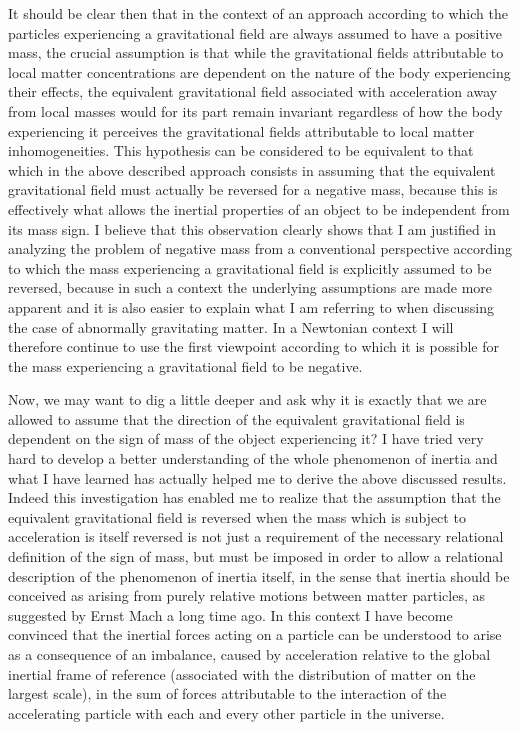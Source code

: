 \documentclass[notitlepage,12pt]{report}
\begin{document}
It should be clear then that in the context of an approach according to which the particles experiencing a gravitational field are always assumed to have a positive mass, the crucial assumption is that while the gravitational fields attributable to local matter concentrations are dependent on the nature of the body experiencing their effects, the equivalent gravitational field associated with acceleration away from local masses would for its part remain invariant regardless of how the body experiencing it perceives the gravitational fields attributable to local matter inhomogeneities. This hypothesis can be considered to be equivalent to that which in the above described approach consists in assuming that the equivalent gravitational field must actually be reversed for a negative mass, because this is effectively what allows the inertial properties of an object to be independent from its mass sign. I believe that this observation clearly shows that I am justified in analyzing the problem of negative mass from a conventional perspective according to which the mass experiencing a gravitational field is explicitly assumed to be reversed, because in such a context the underlying assumptions are made more apparent and it is also easier to explain what I am referring to when discussing the case of abnormally gravitating matter. In a Newtonian context I will therefore continue to use the first viewpoint according to which it is possible for the mass experiencing a gravitational field to be negative.

Now, we may want to dig a little deeper and ask why it is exactly that we are allowed to assume that the direction of the equivalent gravitational field is dependent on the sign of mass of the object experiencing it? I have tried very hard to develop a better understanding of the whole phenomenon of inertia and what I have learned has actually helped me to derive the above discussed results. Indeed this investigation has enabled me to realize that the assumption that the equivalent gravitational field is reversed when the mass which is subject to acceleration is itself reversed is not just a requirement of the necessary relational definition of the sign of mass, but must be imposed in order to allow a relational description of the phenomenon of inertia itself, in the sense that inertia should be conceived as arising from purely relative motions between matter particles, as suggested by Ernst Mach a long time ago. In this context I have become convinced that the inertial forces acting on a particle can be understood to arise as a consequence of an imbalance, caused by acceleration relative to the global inertial frame of reference (associated with the distribution of matter on the largest scale), in the sum of forces attributable to the interaction of the accelerating particle with each and every other particle in the universe.
\end{document}
